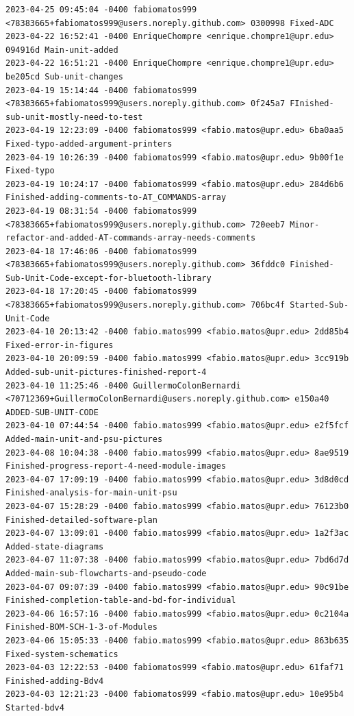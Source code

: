 \documentclass[12pt]{article}
\begin{document}
\begin{lstlisting}
2023-04-25 09:45:04 -0400 fabiomatos999 <78383665+fabiomatos999@users.noreply.github.com> 0300998 Fixed-ADC
2023-04-22 16:52:41 -0400 EnriqueChompre <enrique.chompre1@upr.edu> 094916d Main-unit-added
2023-04-22 16:51:21 -0400 EnriqueChompre <enrique.chompre1@upr.edu> be205cd Sub-unit-changes
2023-04-19 15:14:44 -0400 fabiomatos999 <78383665+fabiomatos999@users.noreply.github.com> 0f245a7 FInished-sub-unit-mostly-need-to-test
2023-04-19 12:23:09 -0400 fabiomatos999 <fabio.matos@upr.edu> 6ba0aa5 Fixed-typo-added-argument-printers
2023-04-19 10:26:39 -0400 fabiomatos999 <fabio.matos@upr.edu> 9b00f1e Fixed-typo
2023-04-19 10:24:17 -0400 fabiomatos999 <fabio.matos@upr.edu> 284d6b6 Finished-adding-comments-to-AT_COMMANDS-array
2023-04-19 08:31:54 -0400 fabiomatos999 <78383665+fabiomatos999@users.noreply.github.com> 720eeb7 Minor-refactor-and-added-AT-commands-array-needs-comments
2023-04-18 17:46:06 -0400 fabiomatos999 <78383665+fabiomatos999@users.noreply.github.com> 36fddc0 Finished-Sub-Unit-Code-except-for-bluetooth-library
2023-04-18 17:20:45 -0400 fabiomatos999 <78383665+fabiomatos999@users.noreply.github.com> 706bc4f Started-Sub-Unit-Code
2023-04-10 20:13:42 -0400 fabio.matos999 <fabio.matos@upr.edu> 2dd85b4 Fixed-error-in-figures
2023-04-10 20:09:59 -0400 fabio.matos999 <fabio.matos@upr.edu> 3cc919b Added-sub-unit-pictures-finished-report-4
2023-04-10 11:25:46 -0400 GuillermoColonBernardi <70712369+GuillermoColonBernardi@users.noreply.github.com> e150a40 ADDED-SUB-UNIT-CODE
2023-04-10 07:44:54 -0400 fabio.matos999 <fabio.matos@upr.edu> e2f5fcf Added-main-unit-and-psu-pictures
2023-04-08 10:04:38 -0400 fabio.matos999 <fabio.matos@upr.edu> 8ae9519 Finished-progress-report-4-need-module-images
2023-04-07 17:09:19 -0400 fabio.matos999 <fabio.matos@upr.edu> 3d8d0cd Finished-analysis-for-main-unit-psu
2023-04-07 15:28:29 -0400 fabio.matos999 <fabio.matos@upr.edu> 76123b0 Finished-detailed-software-plan
2023-04-07 13:09:01 -0400 fabio.matos999 <fabio.matos@upr.edu> 1a2f3ac Added-state-diagrams
2023-04-07 11:07:38 -0400 fabio.matos999 <fabio.matos@upr.edu> 7bd6d7d Added-main-sub-flowcharts-and-pseudo-code
2023-04-07 09:07:39 -0400 fabio.matos999 <fabio.matos@upr.edu> 90c91be Finished-completion-table-and-bd-for-individual
2023-04-06 16:57:16 -0400 fabio.matos999 <fabio.matos@upr.edu> 0c2104a Finished-BOM-SCH-1-3-of-Modules
2023-04-06 15:05:33 -0400 fabio.matos999 <fabio.matos@upr.edu> 863b635 Fixed-system-schematics
2023-04-03 12:22:53 -0400 fabiomatos999 <fabio.matos@upr.edu> 61faf71 Finished-adding-Bdv4
2023-04-03 12:21:23 -0400 fabiomatos999 <fabio.matos@upr.edu> 10e95b4 Started-bdv4

\end{lstlisting}
\end{document}
